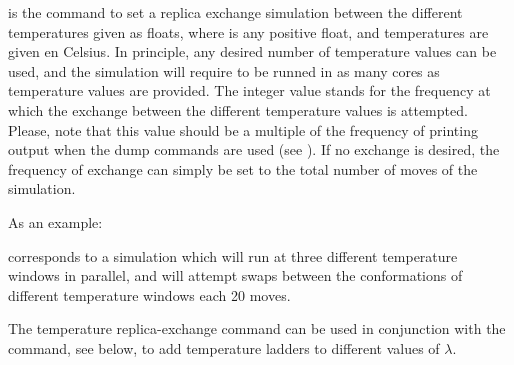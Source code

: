 \documentclass[letterpaper,10pt,english]{sphinxmanual}
\begin{document}
is the command to set a replica exchange simulation between the different temperatures given as floats, where  is any positive float, and temperatures are given en Celsius. In principle, any desired number of temperature values can be used, and the simulation will require to be runned in as many cores as temperature values are provided. The integer value stands for the frequency at which the exchange between the different temperature values is attempted. Please, note that this value should be a multiple of the frequency of printing output when the dump commands are used (see {\hyperref[\detokenize{protoms:frequent-output-generation}]{}}). If no exchange is desired, the frequency of exchange can simply be set to the total number of moves of the simulation.

As an example:

%
\begin{sphinxVerbatim}[commandchars=\\\{\}]
    
\end{sphinxVerbatim}

corresponds to a simulation which will run at three different temperature windows in parallel, and will attempt swaps between the conformations of different temperature windows each 20 moves.

The temperature replica-exchange command can be used in conjunction with the  command, see below, to add temperature ladders to different values of \(\lambda\).

\ignorespaces 
\def\sphinxLiteralBlockLabel{\label{\detokenize{protoms:index-45}}}
%
\begin{sphinxVerbatim}[commandchars=\\\{\}]
               
\end{sphinxVerbatim}
\end{document}
